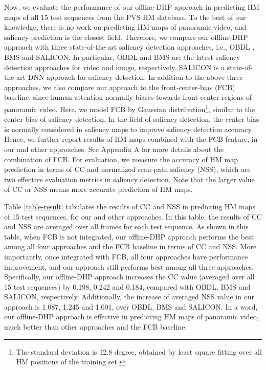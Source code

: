 \documentclass[10pt,journal,compsoc]{IEEEtran}
\begin{document}
Now, we evaluate the performance of our offline-DHP approach in predicting HM maps of all 15 test sequences from the PVS-HM database. To the best of our knowledge, there is no work on predicting HM maps of panoramic video, and saliency prediction is the closest field. Therefore, we compare our offline-DHP approach with three state-of-the-art saliency detection approaches, i.e.,  OBDL  \cite{hossein2015many}, BMS \cite{zhang2016exploiting} and SALICON\cite{huang2015salicon}.
In particular, OBDL  \cite{hossein2015many} and BMS \cite{zhang2016exploiting} are the latest saliency detection approaches for video and image, respectively.
SALICON\cite{huang2015salicon} is a state-of-the-art DNN approach for saliency detection.
In addition to the above three approaches, we also compare our approach to the front-center-bias (FCB) baseline, since human attention normally biases towards front-center regions of panoramic video.
Here, we model FCB by Gaussian distribution\footnote{The standard deviation is 12.8 degree, obtained by least square fitting over all HM positions of the training set.}, similar to the center bias of saliency detection.
In the field of saliency detection, the center bias  \cite{borji2013state} is normally considered in saliency maps to improve saliency detection accuracy. Hence, we further report results of HM maps combined with the FCB feature, in our and other approaches.
See Appendix A for more details about the combination of FCB.
For evaluation, we measure the accuracy of HM map prediction in terms of CC and normalized scan-path saliency (NSS), which are two effective evaluation metrics \textcolor{blue}{\cite{Li_2015_ICCV}} in saliency detection.
Note that the larger value of CC or NSS means more accurate prediction of HM maps.


Table \ref{table-result} tabulates the results of CC and NSS in predicting HM maps of 15 test sequences, for our and other approaches.
In this table, the results of CC and NSS are averaged over all frames for each test sequence.
As shown in this table, when FCB is not integrated, our offline-DHP approach performs the best among all four approaches and the FCB baseline in terms of CC and NSS.
More importantly, once integrated with FCB, all four approaches have performance improvement, and our approach still performs best among all three approaches.
Specifically, our offline-DHP approach increases the CC value (averaged over all 15 test sequences) by 0.198, 0.242 and 0.184, compared with OBDL, BMS and SALICON, respectively.
Additionally, the increase of averaged NSS value in our approach is 1.087, 1.245 and 1.001, over OBDL, BMS and SALICON.
In a word, our offline-DHP approach is effective in predicting HM maps of panoramic video, much better than other approaches and the FCB baseline.
\end{document}
